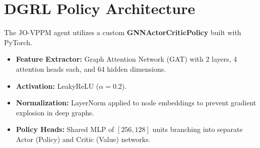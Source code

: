 \documentclass[12pt, a4paper, reqno, oneside]{book}
\begin{document}
\chapter{DGRL Policy Architecture}
\label{appendix:neural_arch}
The JO-VPPM agent utilizes a custom \textbf{GNNActorCriticPolicy} built with PyTorch.
\begin{itemize}
    \item \textbf{Feature Extractor:} Graph Attention Network (GAT) with 2 layers, 4 attention heads each, and 64 hidden dimensions.
    \item \textbf{Activation:} LeakyReLU ($\alpha=0.2$).
    \item \textbf{Normalization:} LayerNorm applied to node embeddings to prevent gradient explosion in deep graphs.
    \item \textbf{Policy Heads:} Shared MLP of $[256, 128]$ units branching into separate Actor (Policy) and Critic (Value) networks.
\end{itemize}

\newpage
{} 
\printbibliography
\end{document}
